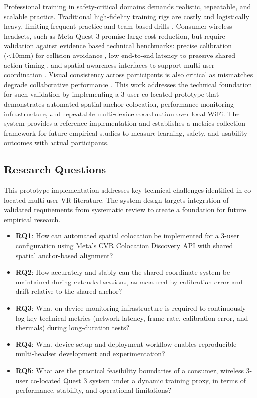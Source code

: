 Professional training in safety-critical domains demands realistic, repeatable, and scalable practice. Traditional high-fidelity training rigs are costly and logistically heavy, limiting frequent practice and team-based drills \cite{SharmaSharad2025IASR}. Consumer wireless headsets, such as Meta Quest 3 promise large cost reduction, but require validation against evidence based technical benchmarks: precise calibration (\textless10mm) for collision avoidance \cite{ReimerDennis2021CfSV}, low end-to-end latency to preserve shared action timing \cite{VanDammeSam2024Iolo}, and spatial awareness interfaces to support multi-user coordination \cite{ChenLei2024Eoep}. Visual consistency across participants is also critical as mismatches degrade collaborative performance \cite{WeissYannick2025ItEo}. This work addresses the technical foundation for such validation by implementing a 3-user co-located prototype that demonstrates automated spatial anchor colocation, performance monitoring infrastructure, and repeatable multi-device coordination over local WiFi. The system provides a reference implementation and establishes a metrics collection framework for future empirical studies to measure learning, safety, and usability outcomes with actual participants.

\subsection{Research Questions}
This prototype implementation addresses key technical challenges identified in co-located multi-user VR literature. The system design targets integration of validated requirements from systematic review to create a foundation for future empirical research.

\begin{itemize}
    \item \textbf{RQ1}: How can automated spatial colocation be implemented for a 3-user configuration using Meta's OVR Colocation Discovery API with shared spatial anchor-based alignment?~\cite{MetaColocationDiscovery2025,MetaSharedSpatialAnchors2025}
    \item \textbf{RQ2}: How accurately and stably can the shared coordinate system be maintained during extended sessions, as measured by calibration error and drift relative to the shared anchor?
    \item \textbf{RQ3}: What on-device monitoring infrastructure is required to continuously log key technical metrics (network latency, frame rate, calibration error, and thermals) during long-duration tests?
    \item \textbf{RQ4}: What device setup and deployment workflow enables reproducible multi-headset development and experimentation?
    \item \textbf{RQ5}: What are the practical feasibility boundaries of a consumer, wireless 3-user co-located Quest 3 system under a dynamic training proxy, in terms of performance, stability, and operational limitations?
\end{itemize}

